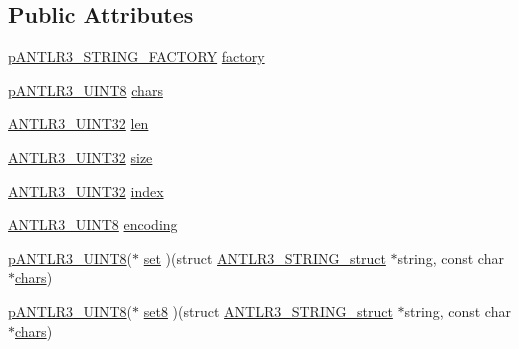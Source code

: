 \subsection*{Public Attributes}
\begin{DoxyCompactItemize}
\item 
\hyperlink{antlr3interfaces_8h_a499a87287d582de04cf736f342b20692}{p\-A\-N\-T\-L\-R3\-\_\-\-S\-T\-R\-I\-N\-G\-\_\-\-F\-A\-C\-T\-O\-R\-Y} \hyperlink{struct_a_n_t_l_r3___s_t_r_i_n_g__struct_abb0b2baef8956c33f1c5745ab6c6b7a7}{factory}
\item 
\hyperlink{antlr3defs_8h_a95c800abcac5d607fd9e3e775ace78c5}{p\-A\-N\-T\-L\-R3\-\_\-\-U\-I\-N\-T8} \hyperlink{struct_a_n_t_l_r3___s_t_r_i_n_g__struct_a7be84d1554437ab99377ab3c623ebd24}{chars}
\item 
\hyperlink{antlr3defs_8h_ac41f744abd0fd25144b9eb9d11b1dfd1}{A\-N\-T\-L\-R3\-\_\-\-U\-I\-N\-T32} \hyperlink{struct_a_n_t_l_r3___s_t_r_i_n_g__struct_a48075cfe15e36cca07604d96d335829d}{len}
\item 
\hyperlink{antlr3defs_8h_ac41f744abd0fd25144b9eb9d11b1dfd1}{A\-N\-T\-L\-R3\-\_\-\-U\-I\-N\-T32} \hyperlink{struct_a_n_t_l_r3___s_t_r_i_n_g__struct_a31c55004043befad2178e0560f6bc218}{size}
\item 
\hyperlink{antlr3defs_8h_ac41f744abd0fd25144b9eb9d11b1dfd1}{A\-N\-T\-L\-R3\-\_\-\-U\-I\-N\-T32} \hyperlink{struct_a_n_t_l_r3___s_t_r_i_n_g__struct_a15e2eb3d2541ac22ed9ef922e3490eaf}{index}
\item 
\hyperlink{antlr3defs_8h_a785358a47238c5936f6bb88108ebbb7e}{A\-N\-T\-L\-R3\-\_\-\-U\-I\-N\-T8} \hyperlink{struct_a_n_t_l_r3___s_t_r_i_n_g__struct_adde88a6f0bf0ad113853474510300c55}{encoding}
\item 
\hyperlink{antlr3defs_8h_a95c800abcac5d607fd9e3e775ace78c5}{p\-A\-N\-T\-L\-R3\-\_\-\-U\-I\-N\-T8}($\ast$ \hyperlink{struct_a_n_t_l_r3___s_t_r_i_n_g__struct_a9e5e26394ed5b31e7df66e5330604912}{set} )(struct \hyperlink{struct_a_n_t_l_r3___s_t_r_i_n_g__struct}{A\-N\-T\-L\-R3\-\_\-\-S\-T\-R\-I\-N\-G\-\_\-struct} $\ast$string, const char $\ast$\hyperlink{struct_a_n_t_l_r3___s_t_r_i_n_g__struct_a7be84d1554437ab99377ab3c623ebd24}{chars})
\item 
\hyperlink{antlr3defs_8h_a95c800abcac5d607fd9e3e775ace78c5}{p\-A\-N\-T\-L\-R3\-\_\-\-U\-I\-N\-T8}($\ast$ \hyperlink{struct_a_n_t_l_r3___s_t_r_i_n_g__struct_a7c4603057e31e0e5d9988e8bfc29c654}{set8} )(struct \hyperlink{struct_a_n_t_l_r3___s_t_r_i_n_g__struct}{A\-N\-T\-L\-R3\-\_\-\-S\-T\-R\-I\-N\-G\-\_\-struct} $\ast$string, const char $\ast$\hyperlink{struct_a_n_t_l_r3___s_t_r_i_n_g__struct_a7be84d1554437ab99377ab3c623ebd24}{chars})

\end{DoxyCompactItemize}
